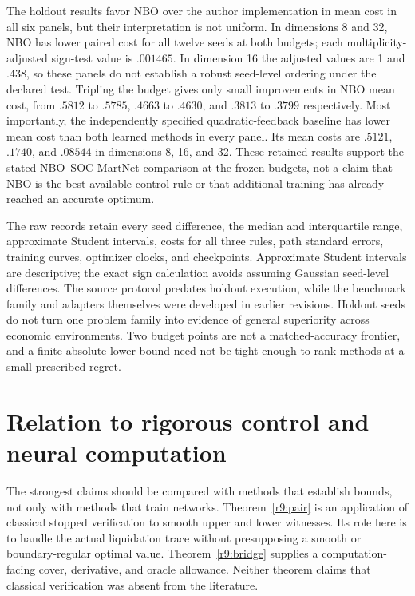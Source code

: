 The holdout results favor NBO over the author implementation in mean cost in all six panels, but their interpretation is not uniform. In dimensions 8 and 32, NBO has lower paired cost for all twelve seeds at both budgets; each multiplicity-adjusted sign-test value is $.001465$. In dimension 16 the adjusted values are 1 and $.438$, so these panels do not establish a robust seed-level ordering under the declared test. Tripling the budget gives only small improvements in NBO mean cost, from $.5812$ to $.5785$, $.4663$ to $.4630$, and $.3813$ to $.3799$ respectively. Most importantly, the independently specified quadratic-feedback baseline has lower mean cost than both learned methods in every panel. Its mean costs are $.5121$, $.1740$, and $.08544$ in dimensions 8, 16, and 32. These retained results support the stated NBO--SOC-MartNet comparison at the frozen budgets, not a claim that NBO is the best available control rule or that additional training has already reached an accurate optimum.

The raw records retain every seed difference, the median and interquartile range, approximate Student intervals, costs for all three rules, path standard errors, training curves, optimizer clocks, and checkpoints. Approximate Student intervals are descriptive; the exact sign calculation avoids assuming Gaussian seed-level differences. The source protocol predates holdout execution, while the benchmark family and adapters themselves were developed in earlier revisions. Holdout seeds do not turn one problem family into evidence of general superiority across economic environments. Two budget points are not a matched-accuracy frontier, and a finite absolute lower bound need not be tight enough to rank methods at a small prescribed regret.





\section{Relation to rigorous control and neural computation}\label{r9:related}
The strongest claims should be compared with methods that establish bounds, not only with methods that train networks. Theorem~\ref{r9:pair} is an application of classical stopped verification to smooth upper and lower witnesses. Its role here is to handle the actual liquidation trace without presupposing a smooth or boundary-regular optimal value. Theorem~\ref{r9:bridge} supplies a computation-facing cover, derivative, and oracle allowance. Neither theorem claims that classical verification was absent from the literature.

